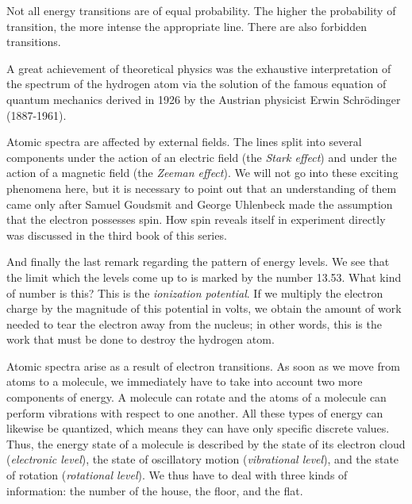 Not all energy transitions are of equal probability. The higher the probability of transition, the more intense the appropriate line. There are also forbidden transitions.

A great achievement of theoretical physics was the exhaustive interpretation of the spectrum of the hydrogen atom via the solution of the famous equation of quantum mechanics derived in 1926 by the Austrian physicist Erwin Schr\"odinger (1887-1961).

Atomic spectra are affected by external fields. The lines split into several components under the action of an electric field (the \emph{Stark effect}) and under the action of a magnetic field (the \emph{Zeeman effect}). We will not go into these exciting phenomena here, but it is necessary to point out that an understanding of them came only after Samuel Goudsmit and George Uhlenbeck made the assumption that the electron possesses spin. How spin reveals itself in experiment directly was discussed in the third book of this series.

And finally the last remark regarding the pattern of energy levels. We see that the limit which the levels come up to is marked by the number 13.53. What kind of number is this? This is the \emph{ionization potential}. If we multiply the electron charge by the magnitude of this potential in volts, we obtain the amount of work needed to tear the electron away from the nucleus; in other words, this is the work that must be done to destroy the hydrogen atom.


Atomic spectra arise as a result of electron transitions. As soon as we move from atoms to a molecule, we immediately have to take into account two more components of energy. A molecule can rotate and the atoms of a molecule can perform vibrations with respect to one another. All these types of energy can likewise be quantized, which means they can have only specific discrete values. Thus, the energy state of a molecule is described by the state of its electron cloud (\emph{electronic level}), the state of oscillatory motion (\emph{vibrational level}), and the state of rotation (\emph{rotational level}). We thus have to deal with three kinds of information: the number of the house, the floor, and the flat.

